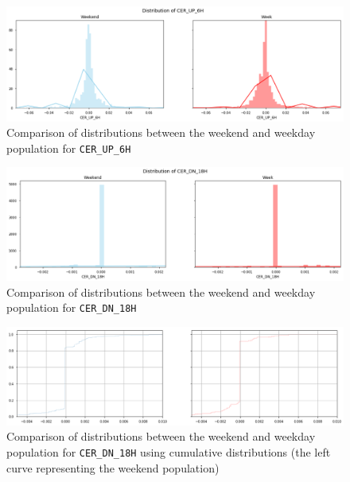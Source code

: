 \begin{figure}[ht]
    \begin{center}
    \includegraphics[width=1\linewidth]{images/KS_CER_UP_6.png}    
    \end{center}
    \caption{Comparison of distributions between the weekend and weekday population for \texttt{CER\_UP\_6H}}
    \label{KS_CER_UP_6}
\end{figure}

\begin{figure}[ht]
    \begin{center}
    \includegraphics[width=1\linewidth]{images/KS_CER_DN_18.png}    
    \end{center}
	\caption{Comparison of distributions between the weekend and weekday population for \texttt{CER\_DN\_18H}}
    \label{KS_CER_DN_18}
\end{figure}

\begin{figure}[ht]
    \begin{center}
    \includegraphics[width=1\linewidth]{images/KS_CER_DN_18_CUMUL.png}    
    \end{center}
    \caption{Comparison of distributions between the weekend and weekday population for \texttt{CER\_DN\_18H} using cumulative distributions (the left curve representing the weekend population)}
    \label{KS_CER_DN_18_CUMUL}
\end{figure}

